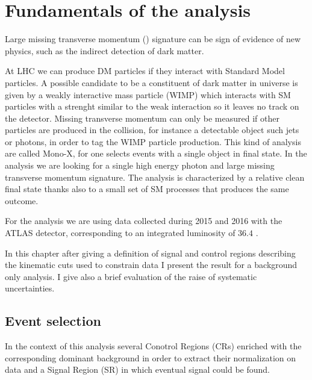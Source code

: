 \chapter{Fundamentals of the \mph analysis}
Large missing transverse momentum (\met) signature can be sign of evidence of new physics, such as the indirect detection of dark matter.

At LHC we can produce DM particles if they interact with Standard Model particles. A possible candidate to be a constituent of dark matter in universe is given by a weakly interactive mass particle (WIMP) which interacts with SM particles with a strenght similar to the weak interaction so it leaves no track on the detector. Missing transverse momentum can only be measured  if other particles are produced in the collision, for instance a detectable object such jets or photons, in order to tag the WIMP particle production. This kind of analysis are called Mono-X, for one selects events with a single object in final state. In the \mph analysis we are looking for a single high energy photon and large missing transverse momentum signature. The \mph analysis is characterized by a relative clean final state thanks also to a small set of SM processes that produces the same outcome.

For the analysis we are using data collected during 2015 and 2016 with the ATLAS detector, corresponding to an integrated luminosity of $36.4$ \ifb.

In this chapter after giving a definition of signal and control regions describing the kinematic cuts used to constrain data I present the result for a background only analysis. I give also a brief evaluation of the raise of systematic uncertainties.

\section{Event selection}
In the context of this \mph analysis several Conotrol Regions (CRs) enriched with the corresponding dominant background in order to extract their normalization on data and a Signal Region (SR) in which eventual signal could be found.


